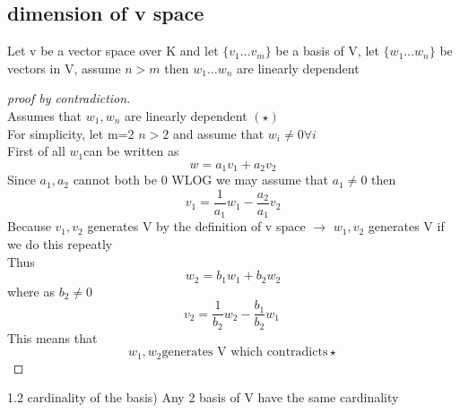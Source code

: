 \documentclass{article}
\newenvironment{corollary}[2][Corollary]{\begin{trivlist}
\item[\hskip \labelsep {\bfseries #1}\hskip \labelsep {\bfseries #2.}]}{\end{trivlist}}
\begin{document}
\subsection{dimension of v space}

\begin{theorem}
     Let v be a vector space over K and let $\{v_1 \dots v_m \}$ be a basis of V, let $\{w_1 \dots w_n\}$ be vectors in V, assume $n>m$ then $w_1 \dots w_n$ are linearly dependent
\end{theorem}
\begin{proof}
    [ proof by contradiction]\\Assumes that $w_1,w_n$ are linearly dependent $(\star)$\\
    For simplicity, let m=2 $n>2$ and assume that $w_i \not =0 \forall i$
    \\First of all $w_1 $can be written as 
    $$w=a_1v_1+a_2v_2$$
Since $a_1,a_2 $ cannot both be 0 WLOG we may assume that $a_1 \neq 0$ then
$$v_1=\frac{1}{a_1}w_1-\frac{a_2}{a_1}v_2$$
Because $v_1, v_2 $ generates V by the definition of v space $\to$ $w_1, v_2$ generates V if we do this repeatly\\
Thus $$w_2=b_1w_1+b_2w_2$$ where as $b_2\neq0$
$$v_2=\frac{1}{b_2}w_2-\frac{b_1}{b_2}w_1\ $$
This means that 
$$w_1,w_2 \text{generates V which contradicts} \star$$
\lightning

\end{proof}


\begin{corollary}
(1.2 cardinality of the basis)    Any 2 basis of V have the same cardinality
\end{corollary}
\end{document}
